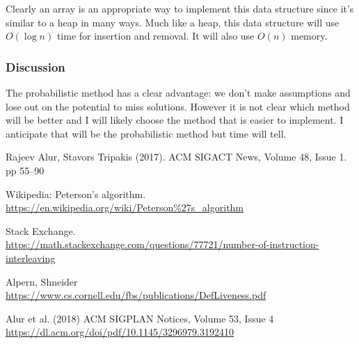 \documentclass[12pt]{article}
\begin{document}
Clearly an array is an appropriate way to implement this data structure since it's similar to a heap in many ways.  Much like a heap, this data structure will use $O(\log{n})$ time for insertion and removal.  It will also use $O(n)$ memory.  


\subsubsection{Discussion}
The probabilistic method has a clear advantage: we don't make assumptions and lose out on the potential to miss solutions.  However it is not clear which method will be better and I will likely choose the method that is easier to implement.  I anticipate that will be the probabilistic method but time will tell.  


\begin{thebibliography}{9}
Rajeev Alur, Stavors Tripakis (2017).  ACM SIGACT News, Volume 48, Issue 1.  pp 55–90

Wikipedia: Peterson's algorithm.  \url{https://en.wikipedia.org/wiki/Peterson\%27s_algorithm}

Stack Exchange.  \\ \url{https://math.stackexchange.com/questions/77721/number-of-instruction-interleaving}

Alpern, Shneider  \\ \url{https://www.cs.cornell.edu/fbs/publications/DefLiveness.pdf}

Alur et al. (2018) ACM SIGPLAN Notices, Volume 53, Issue 4  \\ \url{https://dl.acm.org/doi/pdf/10.1145/3296979.3192410}
\end{thebibliography}
\end{document}
